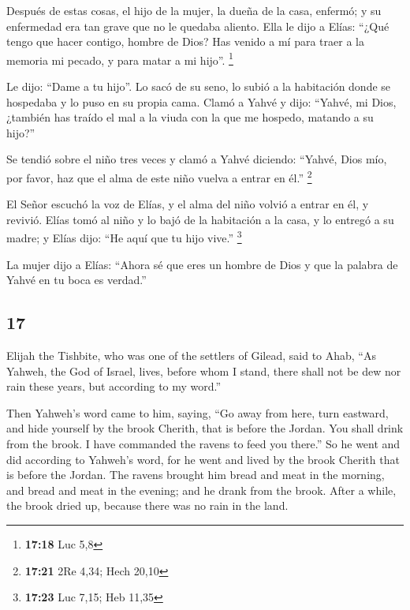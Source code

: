 \begin{paracol}{2}
 Después de estas cosas, el hijo de la mujer, la dueña de
la casa, enfermó; y su enfermedad era tan grave que no le quedaba
aliento.  Ella le dijo a Elías: ``¿Qué tengo que hacer
contigo, hombre de Dios? Has venido a mí para traer a la memoria mi
pecado, y para matar a mi hijo''. \footnote{\textbf{17:18} Luc 5,8}

 Le dijo: ``Dame a tu hijo''. Lo sacó de su seno, lo
subió a la habitación donde se hospedaba y lo puso en su propia cama.
 Clamó a Yahvé y dijo: ``Yahvé, mi Dios, ¿también has
traído el mal a la viuda con la que me hospedo, matando a su hijo?''

 Se tendió sobre el niño tres veces y clamó a Yahvé
diciendo: ``Yahvé, Dios mío, por favor, haz que el alma de este niño
vuelva a entrar en él.'' \footnote{\textbf{17:21} 2Re 4,34; Hech 20,10}

 El Señor escuchó la voz de Elías, y el alma del niño
volvió a entrar en él, y revivió.  Elías tomó al niño y
lo bajó de la habitación a la casa, y lo entregó a su madre; y Elías
dijo: ``He aquí que tu hijo vive.'' \footnote{\textbf{17:23} Luc 7,15;
  Heb 11,35}

 La mujer dijo a Elías: ``Ahora sé que eres un hombre de
Dios y que la palabra de Yahvé en tu boca es verdad.''

\switchcolumn
\begin{otherlanguage}{english}

\hypertarget{section-33}{%
\section{17}\label{section-33}}

 Elijah the Tishbite, who was one of the settlers of
Gilead, said to Ahab, ``As Yahweh, the God of Israel, lives, before whom
I stand, there shall not be dew nor rain these years, but according to
my word.''

 Then Yahweh's word came to him, saying, 
``Go away from here, turn eastward, and hide yourself by the brook
Cherith, that is before the Jordan.  You shall drink from
the brook. I have commanded the ravens to feed you there.''
 So he went and did according to Yahweh's word, for he
went and lived by the brook Cherith that is before the Jordan.
 The ravens brought him bread and meat in the morning, and
bread and meat in the evening; and he drank from the brook.
 After a while, the brook dried up, because there was no
rain in the land.


\end{otherlanguage}
\end{paracol}
